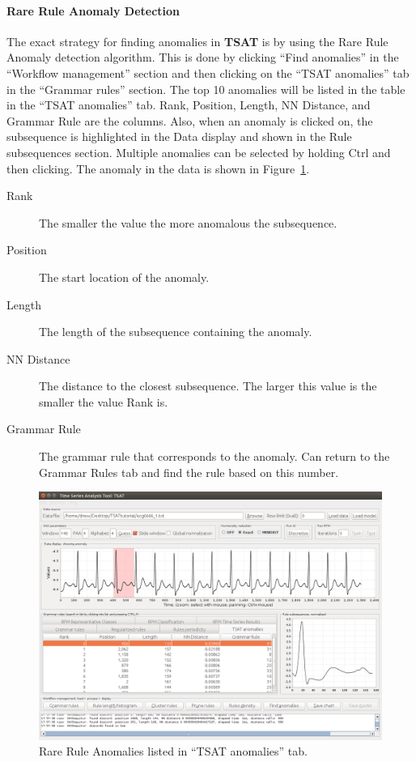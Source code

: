 \documentclass[letterpaper, 12pt]{article}
\newcommand\TSAT{\textbf{TSAT}}
\begin{document}
\paragraph{Rare Rule Anomaly Detection}

The exact strategy for finding anomalies in {\TSAT} is by using the Rare Rule Anomaly detection algorithm.  This is done by clicking ``Find anomalies'' in the ``Workflow management'' section and then clicking on the ``TSAT anomalies'' tab in the ``Grammar rules'' section.  The top 10 anomalies will be listed in the table in the ``TSAT anomalies'' tab.  Rank, Position, Length, NN Distance, and Grammar Rule are the columns.  Also, when an anomaly is clicked on, the subsequence is highlighted in the Data display and shown in the Rule subsequences section.  Multiple anomalies can be selected by holding Ctrl and then clicking.  The anomaly in the data is shown in Figure~\ref{fig:rraresult}.

\begin{description}
	\item[Rank] The smaller the value the more anomalous the subsequence.
	\item[Position] The start location of the anomaly.
	\item[Length] The length of the subsequence containing the anomaly.
	\item[NN Distance] The distance to the closest subsequence.  The larger this value is the smaller the value Rank is.
	\item[Grammar Rule] The grammar rule that corresponds to the anomaly.  Can return to the Grammar Rules tab and find the rule based on this number.
\end{description}

\begin{figure}[H]
	\centering
	\includegraphics[width=\textwidth]{pictures/motifguide/RRAResult}
	\caption{Rare Rule Anomalies listed in ``TSAT anomalies'' tab.}
	\label{fig:rraresult}
\end{figure}
\end{document}
